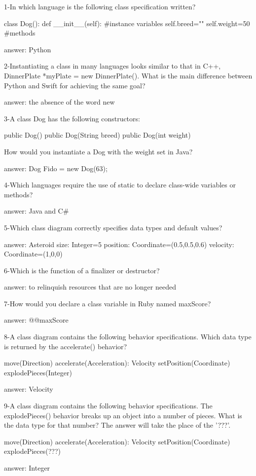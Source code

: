 1-In which language is the following class specification written?

class Dog():
      def __init__(self):
#instance variables
      self.breed=""
       self.weight=50
#methods

answer: Python

2-Instantiating a class in many languages looks similar to that in C++, DinnerPlate *myPlate = new DinnerPlate(). What is the main difference between Python and Swift for achieving the same goal?


answer: the absence of the word new

3-A class Dog has the following constructors:

public Dog() 
public Dog(String breed)
public Dog(int weight)

How would you instantiate a Dog with the weight set in Java?

answer: Dog Fido = new Dog(63);

4-Which languages require the use of static to declare class-wide variables or methods?


answer: Java and C#

5-Which class diagram correctly specifies data types and default values?


answer: Asteroid
size: Integer=5
position: Coordinate=(0.5,0.5,0.6)
velocity: Coordinate=(1,0,0)

6-Which is the function of a finalizer or destructor?


answer: to relinquish resources that are no longer needed

7-How would you declare a class variable in Ruby named maxScore?


answer: @@maxScore

8-A class diagram contains the following behavior specifications. Which data type is returned by the accelerate() behavior?

move(Direction)
accelerate(Acceleration): Velocity
setPosition(Coordinate)
explodePieces(Integer)

answer: Velocity

9-A class diagram contains the following behavior specifications. The explodePieces() behavior breaks up an object into a number of pieces. What is the data type for that number? The answer will take the place of the '???'.

move(Direction)
accelerate(Acceleration): Velocity
setPosition(Coordinate)
explodePieces(???)

answer: Integer

